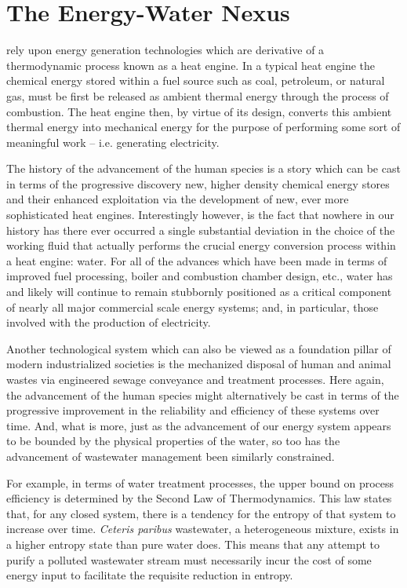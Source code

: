 \newpage

\section{The Energy-Water Nexus}
  
 rely upon energy generation technologies which are derivative of a thermodynamic process known as a heat engine. In a typical heat engine the chemical energy stored within a fuel source such as coal, petroleum, or natural gas, must be first be released as ambient thermal energy through the process of combustion. The heat engine then, by virtue of its design, converts this ambient thermal energy into mechanical energy for the purpose of performing some sort of meaningful work -- i.e. generating electricity.
    
    The history of the advancement of the human species is a story which can be cast in terms of the progressive discovery new, higher density chemical energy stores and their enhanced exploitation via the development of new, ever more sophisticated heat engines. Interestingly however, is the fact that nowhere in our history has there ever occurred a single substantial deviation in the choice of the working fluid that actually performs the crucial energy conversion process within a heat engine: water. For all of the advances which have been made in terms of improved fuel processing, boiler and combustion chamber design, etc., water has and likely will continue to remain stubbornly positioned as a critical component of nearly all major commercial scale energy systems; and, in particular, those involved with the production of electricity. 
    
    Another technological system which can also be viewed as a foundation pillar of modern industrialized societies is the mechanized disposal of human and animal wastes via engineered sewage conveyance and treatment processes. Here again, the advancement of the human species might alternatively be cast in terms of the progressive improvement in the reliability and efficiency of these systems over time. And, what is more, just as the advancement of our energy system appears to be bounded by the physical properties of the water, so too has the advancement of wastewater management been similarly constrained. 
        
    For example, in terms of water treatment processes, the upper bound on process efficiency is determined by the Second Law of Thermodynamics. This law states that, for any closed system, there is a tendency for the entropy of that system to increase over time. \textit{Ceteris paribus} wastewater, a heterogeneous mixture, exists in a higher entropy state than pure water does. This means that any attempt to purify a polluted wastewater stream must necessarily incur the cost of some energy input to facilitate the requisite reduction in entropy. 
    

